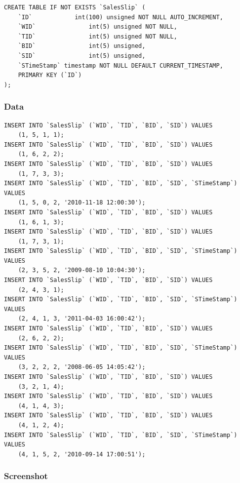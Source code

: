 \documentclass[10pt, a4paper]{article}
\begin{document}
\begin{verbatim}
CREATE TABLE IF NOT EXISTS `SalesSlip` (
  	`ID`       		int(100) unsigned NOT NULL AUTO_INCREMENT,
  	`WID`        		int(5) unsigned NOT NULL,
  	`TID`        		int(5) unsigned NOT NULL,
  	`BID`        		int(5) unsigned,
  	`SID`        		int(5) unsigned,
  	`STimeStamp` timestamp NOT NULL DEFAULT CURRENT_TIMESTAMP,
  	PRIMARY KEY (`ID`)
);
\end{verbatim}

\subsubsection{Data}

\begin{verbatim}
INSERT INTO `SalesSlip` (`WID`, `TID`, `BID`, `SID`) VALUES
  	(1, 5, 1, 1);
INSERT INTO `SalesSlip` (`WID`, `TID`, `BID`, `SID`) VALUES
  	(1, 6, 2, 2);
INSERT INTO `SalesSlip` (`WID`, `TID`, `BID`, `SID`) VALUES
  	(1, 7, 3, 3);
INSERT INTO `SalesSlip` (`WID`, `TID`, `BID`, `SID`, `STimeStamp`) VALUES
  	(1, 5, 0, 2, '2010-11-18 12:00:30');
INSERT INTO `SalesSlip` (`WID`, `TID`, `BID`, `SID`) VALUES
  	(1, 6, 1, 3);
INSERT INTO `SalesSlip` (`WID`, `TID`, `BID`, `SID`) VALUES
  	(1, 7, 3, 1);
INSERT INTO `SalesSlip` (`WID`, `TID`, `BID`, `SID`, `STimeStamp`) VALUES
  	(2, 3, 5, 2, '2009-08-10 10:04:30');
INSERT INTO `SalesSlip` (`WID`, `TID`, `BID`, `SID`) VALUES
  	(2, 4, 3, 1);
INSERT INTO `SalesSlip` (`WID`, `TID`, `BID`, `SID`, `STimeStamp`) VALUES
  	(2, 4, 1, 3, '2011-04-03 16:00:42');
INSERT INTO `SalesSlip` (`WID`, `TID`, `BID`, `SID`) VALUES
  	(2, 6, 2, 2);
INSERT INTO `SalesSlip` (`WID`, `TID`, `BID`, `SID`, `STimeStamp`) VALUES
  	(3, 2, 2, 2, '2008-06-05 14:05:42');
INSERT INTO `SalesSlip` (`WID`, `TID`, `BID`, `SID`) VALUES
  	(3, 2, 1, 4);
INSERT INTO `SalesSlip` (`WID`, `TID`, `BID`, `SID`) VALUES
  	(4, 1, 4, 3);
INSERT INTO `SalesSlip` (`WID`, `TID`, `BID`, `SID`) VALUES
  	(4, 1, 2, 4);
INSERT INTO `SalesSlip` (`WID`, `TID`, `BID`, `SID`, `STimeStamp`) VALUES
  	(4, 1, 5, 2, '2010-09-14 17:00:51');
\end{verbatim}

\pagebreak
\subsubsection{Screenshot}
\end{document}
